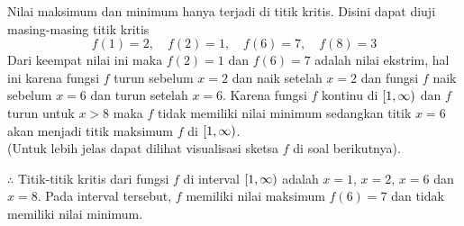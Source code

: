 \begin{enumerate}[leftmargin=*, label={\arabic*}.]
\begin{enumerate}[label={\alph*}.]
    Nilai maksimum dan minimum hanya terjadi di titik kritis. Disini dapat diuji masing-masing 
    titik kritis
    \[
        f(1) = 2, \quad f(2)=1, \quad f(6) =7, \quad f(8) = 3
    \]
    Dari keempat nilai ini maka $f(2)=1$ dan $f(6)=7$ adalah nilai ekstrim, hal ini karena fungsi $f$ 
    turun sebelum $x=2$ dan naik setelah $x=2$ dan fungsi $f$ naik sebelum $x=6$ dan turun setelah 
    $x=6$. Karena fungsi $f$ kontinu di $[1,\infty)$ dan $f$ turun untuk $x>8$ maka 
    $f$ tidak memiliki nilai minimum sedangkan titik $x=6$ akan menjadi titik maksimum $f$ di 
    $[1,\infty)$. \\
    (Untuk lebih jelas dapat dilihat visualisasi sketsa $f$ di soal 
    berikutnya).

    $\therefore$ Titik-titik kritis dari fungsi $f$ di interval $[1,\infty)$ adalah 
    $x=1$, $x=2$, $x=6$ dan $x=8$. Pada interval tersebut, $f$ memiliki nilai maksimum $f(6)=7$ 
    dan tidak memiliki nilai minimum.


\end{enumerate}
\end{enumerate}
